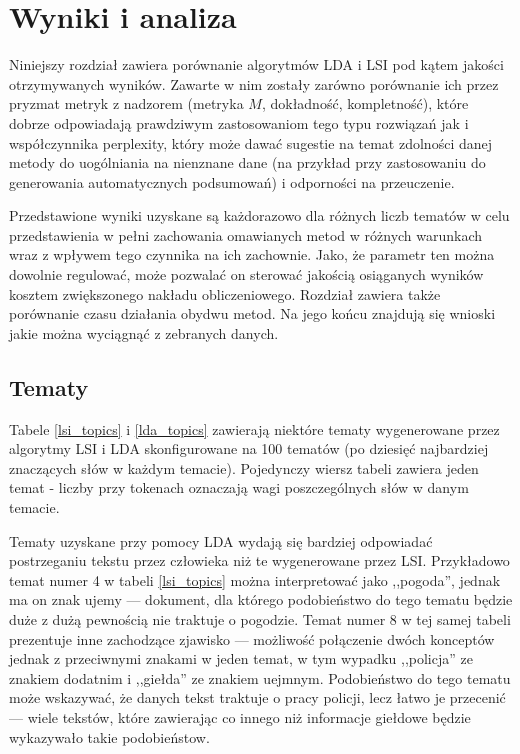\documentclass[11pt,a4paper]{article}
\begin{document}
\pagebreak

\section{Wyniki i analiza}
\label{sec:results}

Niniejszy rozdział zawiera porównanie algorytmów LDA i LSI pod kątem jakości
otrzymywanych wyników. Zawarte w nim zostały zarówno porównanie ich przez
pryzmat metryk z nadzorem (metryka $M$, dokładność, kompletność), które dobrze
odpowiadają prawdziwym zastosowaniom tego typu rozwiązań jak i współczynnika
perplexity, który może dawać sugestie na temat zdolności danej metody do
uogólniania na nienznane dane (na przykład przy zastosowaniu do generowania
automatycznych podsumowań) i odporności na przeuczenie.

Przedstawione wyniki uzyskane są każdorazowo dla różnych liczb tematów w celu
przedstawienia w pełni zachowania omawianych metod w różnych warunkach wraz z
wpływem tego czynnika na ich zachownie. Jako, że parametr ten można dowolnie
regulować, może pozwalać on sterować jakością osiąganych wyników kosztem
zwiększonego nakładu obliczeniowego. Rozdział zawiera także porównanie czasu
działania obydwu metod. Na jego końcu znajdują się wnioski jakie można
wyciągnąć z zebranych danych.

\subsection{Tematy}
Tabele \ref{lsi_topics} i \ref{lda_topics} zawierają niektóre tematy
wygenerowane przez algorytmy LSI i LDA skonfigurowane na 100 tematów (po
dziesięć najbardziej znaczących słów w każdym temacie). Pojedynczy wiersz
tabeli zawiera jeden temat - liczby przy tokenach oznaczają wagi poszczególnych
słów w danym temacie.

Tematy uzyskane przy pomocy LDA wydają się bardziej odpowiadać postrzeganiu
tekstu przez człowieka niż te wygenerowane przez LSI.  Przykładowo temat numer
4 w tabeli \ref{lsi_topics} można interpretować jako ,,pogoda'', jednak ma on
znak ujemy --- dokument, dla którego podobieństwo do tego tematu będzie duże z
dużą pewnością nie traktuje o pogodzie. Temat numer 8 w tej samej tabeli
prezentuje inne zachodzące zjawisko --- możliwość połączenie dwóch konceptów
jednak z przeciwnymi znakami w jeden temat, w tym wypadku ,,policja'' ze
znakiem dodatnim i ,,giełda'' ze znakiem uejmnym. Podobieństwo do tego tematu
może wskazywać, że danych tekst traktuje o pracy policji, lecz łatwo je
przecenić --- wiele tekstów, które zawierając co innego niż informacje giełdowe
będzie wykazywało takie podobieństow.
\end{document}
